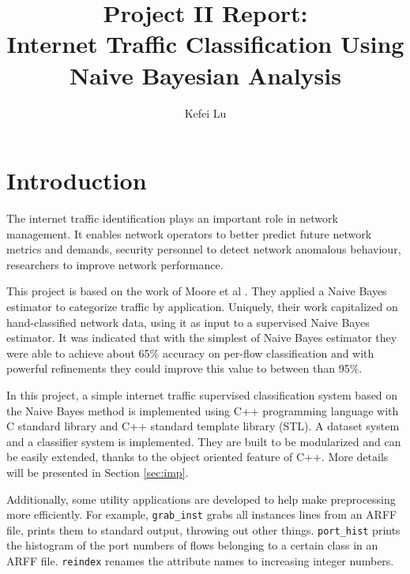 \documentclass[a4paper,12pt]{article}
\author{Kefei Lu}
\title{Project II Report:\\Internet Traffic Classification Using Naive Bayesian Analysis}
\begin{document}
\maketitle
\tableofcontents
\newpage

\section{Introduction}
The internet traffic identification plays an important role in network management. It enables network operators to better predict future network metrics and demands, security personnel to detect network anomalous behaviour, researchers to improve network performance.


This project is based on the work of Moore et al \cite{moore2005itc}. They applied a Naive Bayes estimator to categorize traffic by application. Uniquely, their work capitalized on hand-classified network data, using it as input to a supervised Naive Bayes estimator. It was indicated that with the simplest of Naive Bayes estimator they were able to achieve about 65\% accuracy on per-flow classification and with powerful refinements they could improve this value to between than 95\%.

In this project, a simple internet traffic supervised classification system based on the Naive Bayes method \cite{moore2005itc} is implemented using C++ programming language with C standard library and C++ standard template library (STL). A dataset system and a classifier system is implemented. They are built to be modularized and can be easily extended, thanks to the object oriented feature of C++. More details will be presented in Section \ref{sec:imp}.

Additionally, some utility applications are developed to help make preprocessing more efficiently. For example, \verb|grab_inst| grabs all instances lines from an ARFF file, prints them to standard output, throwing out other things. \verb|port_hist| prints the histogram of the port numbers of flows belonging to a certain class in an ARFF file. \verb|reindex| renames the attribute names to increasing integer numbers.
\end{document}

